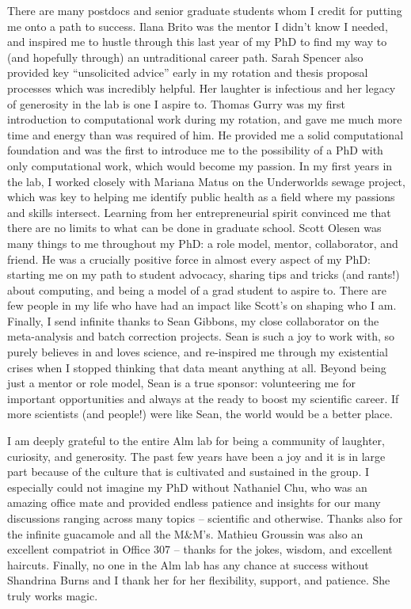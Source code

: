 \begin{singlespace}
There are many postdocs and senior graduate students whom I credit for putting me onto a path to success.
Ilana Brito was the mentor I didn't know I needed, and inspired me to hustle through this last year of my PhD to find my way to (and hopefully through) an untraditional career path.
Sarah Spencer also provided key ``unsolicited advice'' early in my rotation and thesis proposal processes which was incredibly helpful.
Her laughter is infectious and her legacy of generosity in the lab is one I aspire to.
Thomas Gurry was my first introduction to computational work during my rotation, and gave me much more time and energy than was required of him.
He provided me a solid computational foundation and was the first to introduce me to the possibility of a PhD with only computational work, which would become my passion.
In my first years in the lab, I worked closely with Mariana Matus on the Underworlds sewage project, which was key to helping me identify public health as a field where my passions and skills intersect.
Learning from her entrepreneurial spirit convinced me that there are no limits to what can be done in graduate school.
Scott Olesen was many things to me throughout my PhD: a role model, mentor, collaborator, and friend.
He was a crucially positive force in almost every aspect of my PhD: starting me on my path to student advocacy, sharing tips and tricks (and rants!) about computing, and being a model of a grad student to aspire to.
There are few people in my life who have had an impact like Scott's on shaping who I am.
Finally, I send infinite thanks to Sean Gibbons, my close collaborator on the meta-analysis and batch correction projects.
Sean is such a joy to work with, so purely believes in and loves science, and re-inspired me through my existential crises when I stopped thinking that data meant anything at all.
Beyond being just a mentor or role model, Sean is a true sponsor: volunteering me for important opportunities and always at the ready to boost my scientific career.
If more scientists (and people!) were like Sean, the world would be a better place.

I am deeply grateful to the entire Alm lab for being a community of laughter, curiosity, and generosity.
The past few years have been a joy and it is in large part because of the culture that is cultivated and sustained in the group.
I especially could not imagine my PhD without Nathaniel Chu, who was an amazing office mate and provided endless patience and insights for our many discussions ranging across many topics -- scientific and otherwise.
Thanks also for the infinite guacamole and all the M\&M's.
Mathieu Groussin was also an excellent compatriot in Office 307 -- thanks for the jokes, wisdom, and excellent haircuts.
Finally, no one in the Alm lab has any chance at success without Shandrina Burns and I thank her for her flexibility, support, and patience. She truly works magic.


\end{singlespace}
